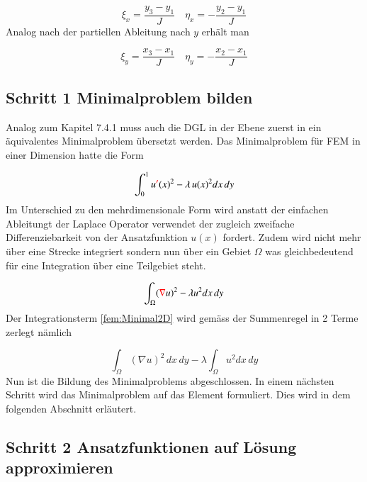 \begin{equation}
			\xi_x = \frac{y_3 - y_1}{J} \quad \eta_x = -\frac{y_2 - y_1}{J}
\end{equation}
Analog nach der partiellen Ableitung nach $y$ erhält man

\begin{equation}
			\xi_y = \frac{x_3 - x_1}{J} \quad \eta_y = -\frac{x_2 - x_1}{J}
\end{equation}

\subsection{Schritt 1 Minimalproblem bilden}

Analog zum Kapitel 7.4.1 muss auch die DGL in der Ebene zuerst in ein äquivalentes Minimalproblem übersetzt werden. Das Minimalproblem für FEM in einer Dimension hatte die Form

\begin{equation}
			\int_0^1 u \textcolor{red}{'} (x)^2 - \lambda \, u(x)^2 dx \,dy
			\label{fem:Minimal1D}
\end{equation}
Im Unterschied zu den mehrdimensionale Form wird anstatt der einfachen Ableitungt der Laplace Operator verwendet der zugleich zweifache Differenziebarkeit von der Ansatzfunktion $u(x)$ fordert. Zudem wird nicht mehr über eine Strecke integriert sondern nun über ein Gebiet $\Omega$ was gleichbedeutend für eine Integration über eine Teilgebiet steht.

\begin{equation}
			\int_{\Omega} (\textcolor{red}{\nabla} u)^2 - \lambda u^2 dx \, dy
			\label{fem:Minimal2D}
\end{equation}
Der Integrationsterm \ref{fem:Minimal2D} wird gemäss der Summenregel in 2 Terme zerlegt nämlich 

\begin{equation}
			\int_{\Omega} (\nabla u)^2 \, dx \, dy - \lambda \int_{\Omega} u^2 dx \, dy
			\label{fem:Minimal2D2Term}
\end{equation}
Nun ist die Bildung des Minimalproblems abgeschlossen. In einem nächsten Schritt wird das Minimalproblem auf das Element formuliert. Dies wird in dem folgenden Abschnitt erläutert.

\subsection{Schritt 2 Ansatzfunktionen auf Lösung approximieren}

